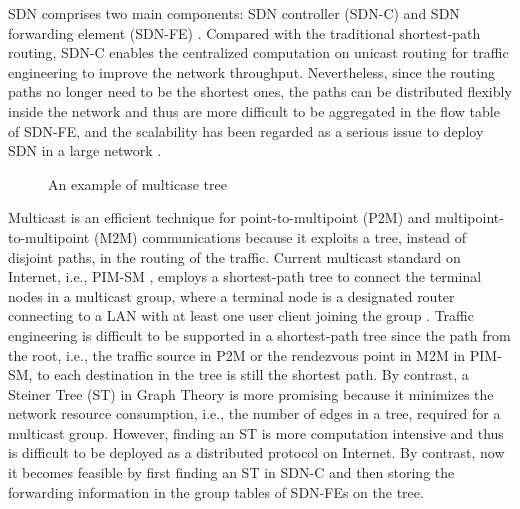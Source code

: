 \documentclass[conference]{IEEEtran}
\begin{document}
SDN comprises two main components: SDN controller (SDN-C) and SDN
forwarding element (SDN-FE) \cite{OpenFlow2013}. Compared with the
traditional shortest-path routing, SDN-C enables the centralized computation on
unicast routing for traffic engineering \cite{Agarwal2013} to improve the network
throughput. Nevertheless, since the routing paths no longer need to be the
shortest ones, the paths can be distributed flexibly inside the network and
thus are more difficult to be aggregated in the flow table of SDN-FE, and
the scalability has been regarded as a serious issue to deploy SDN in a
large network \cite{Agarwal2013, Kanizo2013}.

\begin{figure}[h]
\centering
{}
\caption{An example of multicase tree}
\label{fig1:subfig}
\end{figure}

Multicast is an efficient technique for point-to-multipoint (P2M) and
multipoint-to-multipoint (M2M) communications because it exploits a tree,
instead of disjoint paths, in the routing of the traffic. Current multicast
standard on Internet, i.e., PIM-SM \cite{Fenner2006}, employs a shortest-path tree to
connect the terminal nodes in a multicast group, where a terminal node is a designated router connecting to a LAN with at least one user client joining the group \cite{Cain2002}. Traffic engineering is
difficult to be supported in a shortest-path tree since the path from the
root, i.e., the traffic source in P2M or the rendezvous point in M2M in
PIM-SM, to each destination in the tree is still the shortest path. By contrast, a
Steiner Tree (ST) \cite{Takahashi1980} in Graph Theory is more promising because it minimizes
the network resource consumption, i.e., the number of edges in a tree,
required for a multicast group. However, finding an ST is more computation
intensive and thus is difficult to be deployed as a distributed protocol on
Internet. By contrast, now it becomes feasible by first finding an ST in
SDN-C and then storing the forwarding information in the group tables of
SDN-FEs on the tree.
\end{document}
